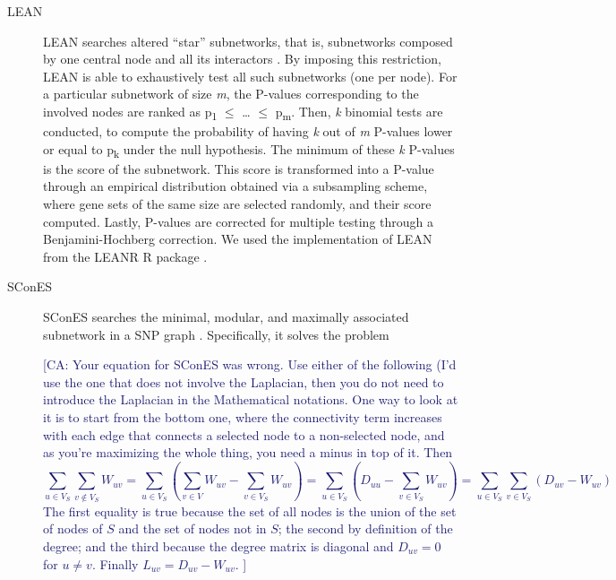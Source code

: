 \documentclass[twocolumn, 11pt]{article}
\newcommand{\cazcom}[2]{{\uline{#1}}\unskip\space\textcolor{MidnightBlue}{[CA: #2]}}
\begin{document}
\begin{description}
\item[{LEAN}] LEAN searches altered ``star'' subnetworks, that is, subnetworks composed by one central node and all its interactors \cite{gwinner_network-based_2016}. By imposing this restriction, LEAN is able to exhaustively test all such subnetworks (one per node). For a particular subnetwork of size \emph{m}, the P-values corresponding to the involved nodes are ranked as p\textsubscript{1} \(\le\) \dots{} \(\le\) p\textsubscript{m}. Then, \emph{k} binomial tests are conducted, to compute the probability of having \emph{k} out of \emph{m} P-values lower or equal to p\textsubscript{k} under the null hypothesis. The minimum of these \emph{k} P-values is the score of the subnetwork. This score is transformed into a P-value through an empirical distribution obtained via a subsampling scheme, where gene sets of the same size are selected randomly, and their score computed. Lastly, P-values are corrected for multiple testing through a Benjamini-Hochberg correction. We used the implementation of LEAN from the LEANR R package \cite{leanr}.
\item[{SConES}] SConES searches the minimal, modular, and maximally associated subnetwork in a SNP graph \cite{azencott_efficient_2013}. Specifically, it solves the problem


\cazcom{}{Your equation for SConES was wrong.
Use either of the following (I'd use the one that does not involve the Laplacian, then you do not need to introduce the Laplacian in the Mathematical notations.
One way to look at it is to start from the bottom one, where the connectivity term increases with each edge that connects a selected node to a non-selected node, and as you're maximizing the whole thing, you need a minus in top of it. Then 
\[
\sum_{u \in V_S} \sum_{v \not\in V_S} W_{uv} = \sum_{u \in V_S} \left(\sum_{v \in V} W_{uv} - \sum_{v \in V_S} W_{uv} \right) = \sum_{u \in V_S} \left(D_{uu} - \sum_{v \in V_S} W_{uv} \right) 
= \sum_{u \in V_S} \sum_{v \in V_S} \left(D_{uv} - W_{uv} \right) \]
The first equality is true because the set of all nodes is the union of the set of nodes of $S$ and the set of nodes not in $S$; the second by definition of the degree; and the third because the degree matrix is diagonal and $D_{uv}=0$ for $u \neq v$. Finally $L_{uv} = D_{uv} - W_{uv}$.
}


\end{description}
\end{document}
